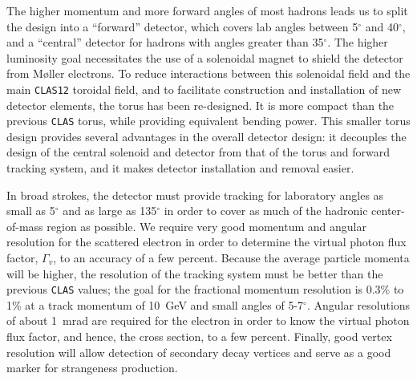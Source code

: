 The higher momentum and more forward angles of most hadrons leads us to 
split the design into a ``forward'' detector, which covers lab angles between 
5$^\circ$ and 40$^\circ$, and a ``central'' detector for hadrons with angles 
greater than 35$^\circ$.  The higher luminosity goal necessitates the use of 
a solenoidal magnet to shield the detector from M{\o}ller electrons.  To 
reduce interactions between this solenoidal field and the main {\tt CLAS12} 
toroidal field, and to facilitate construction and installation of new 
detector elements, the torus has been re-designed.  It is more compact than 
the previous {\tt CLAS} torus, while providing equivalent bending power.  This 
smaller torus design provides several advantages in the overall detector 
design: it decouples the design of the central solenoid and detector from 
that of the torus and forward tracking system, and it makes detector 
installation and removal easier.  

In broad strokes, the detector must provide tracking for laboratory angles as 
small as 5$^\circ$ and as large as 135$^\circ$ in order to cover as much of 
the hadronic center-of-mass region as possible.  We require very good momentum 
and angular resolution for the scattered electron in order to determine the 
virtual photon flux factor, $\Gamma_v$, to an accuracy of a few percent.
Because the average particle momenta will be higher, the resolution of the 
tracking system must be better than the previous {\tt CLAS} values; the goal 
for the fractional momentum resolution is 0.3\% to  1\% at a track momentum 
of 10~GeV and small angles of 5-7$^\circ$.  Angular resolutions of about 1~mrad are required for the electron 
in order to know the virtual photon flux factor, and hence, the cross section, 
to a few percent. Finally, good vertex resolution will allow detection of 
secondary decay vertices and serve as a good marker for strangeness production.


















































